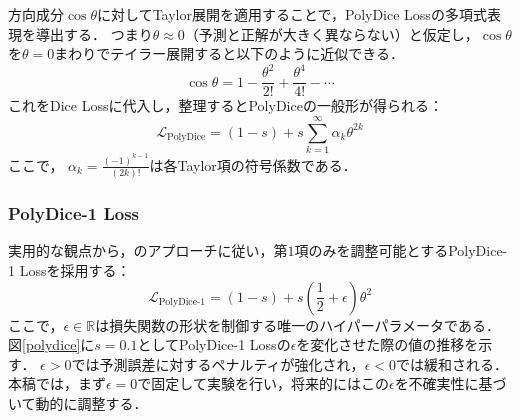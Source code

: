 \documentclass[10pt, a4paper, twocolumn]{jarticle}
\begin{document}
方向成分$\cos \theta$に対してTaylor展開を適用することで，PolyDice Lossの多項式表現を導出する．
つまり$\theta \approx 0$（予測と正解が大きく異ならない）と仮定し，$\cos{\theta}$を$\theta = 0$まわりでテイラー展開すると以下のように近似できる．
\begin{equation}
  \cos{\theta} = 1 - \frac{\theta ^ 2}{2!} + \frac{\theta ^ 4}{4!} - \cdots
\end{equation}
これをDice Lossに代入し，整理するとPolyDiceの一般形が得られる：
\begin{equation}
  \mathcal{L}_{\text{PolyDice}} = (1 - s) + s \sum_{k = 1}^{\infty} \alpha_k \theta ^ {2k}
\end{equation}
ここで， $\alpha_k=\frac{(-1)^{k-1}}{(2k)!}$は各Taylor項の符号係数である．


\subsubsection{PolyDice-1 Loss}
実用的な観点から，\cite{leng2022polyloss}のアプローチに従い，第$1$項のみを調整可能とするPolyDice-1 Lossを採用する：
\begin{equation}
  \mathcal{L}_{\text{PolyDice-1}} = (1 - s) + s \left(\frac{1}{2} + \epsilon\right) \theta^2
\end{equation}
ここで，$\epsilon \in \mathbb{R}$は損失関数の形状を制御する唯一のハイパーパラメータである．
図\ref{polydice}に$s = 0.1$としてPolyDice-1 Lossの$\epsilon$を変化させた際の値の推移を示す．
$\epsilon > 0$では予測誤差に対するペナルティが強化され，$\epsilon < 0$では緩和される．
本稿では，まず$\epsilon = 0$で固定して実験を行い，将来的にはこの$\epsilon$を不確実性に基づいて動的に調整する．
\end{document}
